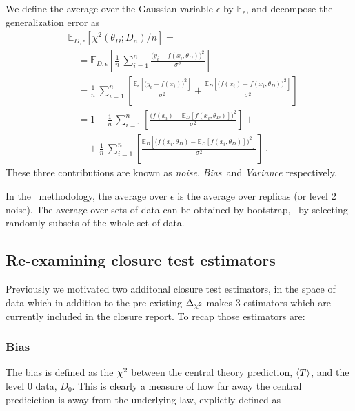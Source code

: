 We define the average over the Gaussian variable $\epsilon$ by
$\mathbb{E}_\epsilon$, and decompose the generalization error as 
\begin{align}
    \label{eq:GenErr}
    &\mathbb{E}_{D,\epsilon}\left[\chi^2(\theta_D; D_n)/n\right] = \nonumber \\
    &\quad = \mathbb{E}_{D,\epsilon}\left[
        \frac{1}{n}\, \sum_{i=1}^n 
        \frac{\Big(
            y_i - f(x_i,\theta_D)
        \Big)^2}{\sigma^2}   
    \right] \\
    &\quad = \frac{1}{n}\, \sum_{i=1}^n \left[
        \frac{\mathbb{E}_\epsilon\left[
            \Big(y_i - f(x_i)\Big)^2    
        \right]}{\sigma^2}    
        + \frac{\mathbb{E}_D\left[\Big(f(x_i)-f(x_i,\theta_D)\Big)^2\right]}{\sigma^2}
    \right] \\
    &\quad = 1 + \frac{1}{n}\, \sum_{i=1}^n \left[
            \frac{\Big(f(x_i) - \mathbb{E}_D\left[f(x_i,\theta_D)\right]\Big)^2}{\sigma^2}
        \right] + \nonumber \\
    &\quad \quad +
        \frac{1}{n}\, \sum_{i=1}^n \left[
            \frac{\mathbb{E}_D\left[\Big(f(x_i,\theta_D) - \mathbb{E}_D\left[f(x_i,\theta_D)\right]\Big)^2\right]}{\sigma^2}
        \right]\, . 
\end{align}
These three contributions are known as {\em noise}, {\em Bias}\ and {\em Variance} respectively.

In the \nnpdf\ methodology, the average over $\epsilon$ is the average over replicas (or level 2 noise). The average over sets of data can be obtained by bootstrap, \ie\ by selecting randomly subsets of the whole set of data.  

\subsection{Re-examining closure test estimators}

Previously we motivated two additonal closure test estimators, in the space of data
which in addition to the pre-existing $\Delta_{\chi^{2}}$ makes 3 estimators which are currently
included in the \vphys closure report. To recap those estimators are:

\subsubsection*{Bias}

The bias is defined as the $\chi^{2}$ between the central theory prediction, $\langle T \rangle$,
and the level 0 data, $D_{0}$. This is clearly a measure of how far away the
central prediciction is away from the underlying law, explictly defined as

